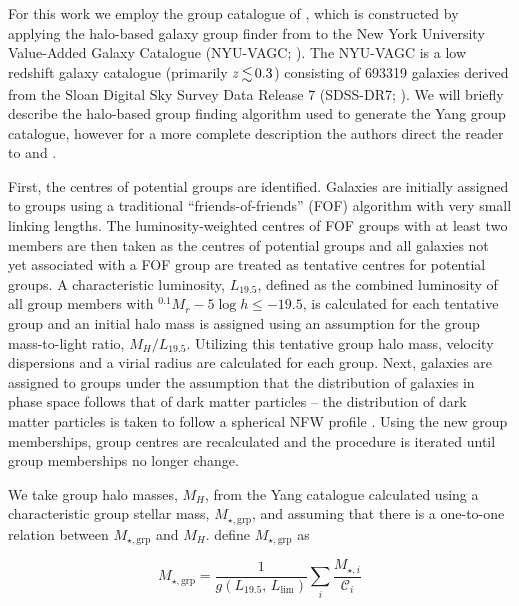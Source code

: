 \documentclass[a4paper,fleqn,usenatbib]{mnras}
\begin{document}
For this work we employ the group catalogue of \citet{yang2007}, which
is constructed by applying the halo-based galaxy group finder from
\citet{yang2005, yang2007} to the New York University Value-Added
Galaxy Catalogue (NYU-VAGC; \citealt{blanton2005}).  The NYU-VAGC is a
low redshift galaxy catalogue (primarily $z \la 0.3$) consisting of
693319 galaxies derived from the Sloan Digital Sky Survey Data Release
7 (SDSS-DR7; \citealt{abazajian2009}).  We will briefly describe the
halo-based group finding algorithm used to generate the Yang group catalogue,
however for a more complete description the authors direct the reader
to \citet{yang2005} and \citet{yang2007}.
\par
First, the centres of potential groups are identified.  Galaxies are
initially assigned to groups using a traditional
``friends-of-friends'' (FOF) algorithm \citep[e.g.][]{huchra1982} with
very small linking lengths.  The luminosity-weighted centres of
FOF groups with at least two members are then taken as the centres of
potential groups and all galaxies not yet associated with a FOF group
are treated as tentative centres for potential groups.  A
characteristic luminosity, $L_{19.5}$, defined as the combined
luminosity of all group members with $^{0.1}M_r - 5\log h \le -19.5$,
is calculated for each tentative group and an initial halo mass is
assigned using an assumption for the group mass-to-light ratio,
$M_H/L_{19.5}$.  Utilizing this tentative group halo mass, velocity
dispersions and a virial radius are calculated for each group.  Next,
galaxies are assigned to groups under the assumption that the
distribution of galaxies in phase space follows that of dark matter
particles -- the distribution of dark matter particles is taken to
follow a spherical NFW profile \citep{navarro1997}.  Using the new
group memberships, group centres are recalculated and the procedure is
iterated until group memberships no longer change.
\par
We take group halo masses, $M_H$, from the Yang catalogue calculated
using a characteristic group stellar mass, $M_{\star,\text{grp}}$, and
assuming that there is a one-to-one relation between $M_{\star,\text{grp}}$
and $M_H$.  \citet{yang2007} define $M_{\star,\text{grp}}$ as

\begin{equation}
  M_{\star,\text{grp}} = \frac{1}{g(L_{19.5},\,L_{\text{lim}})} \sum_i
  \frac{M_{\star,i}}{\mathcal{C}_i}
\end{equation}
\end{document}

